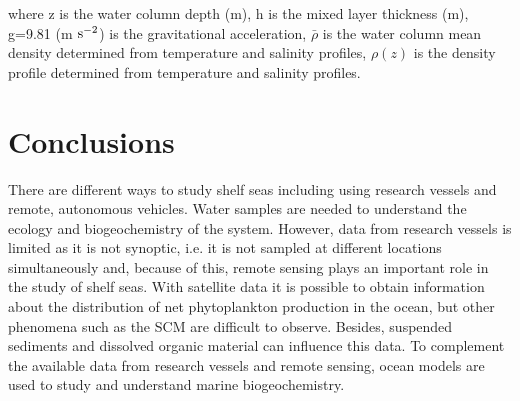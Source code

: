 \documentclass{article}
\begin{document}
\noindent where z is the water column depth (m), h is the mixed layer thickness (m), g=9.81 (m $\rm s^{-2}$) is the gravitational acceleration, $\bar{\rho}$ is the water column mean density determined from temperature and salinity profiles, $\rho(z)$ is the density profile determined from temperature and salinity 
profiles. 

\section{Conclusions}
\label{sec:conc}
\noindent There are different ways to study shelf seas including using research vessels and remote, autonomous vehicles. Water samples are needed to understand the ecology and biogeochemistry of the system. However, data from research vessels is limited as it is not synoptic, i.e. it is not sampled at different locations simultaneously and, because of this, remote sensing plays an important role in the study of shelf seas. With satellite data it is possible to obtain information about the distribution of net phytoplankton production in the ocean, but other phenomena such as the SCM are difficult to observe. Besides, suspended sediments and dissolved organic material can influence this data. To complement the available data from research vessels and remote sensing, ocean models are used to study and understand marine biogeochemistry. 
\end{document}
